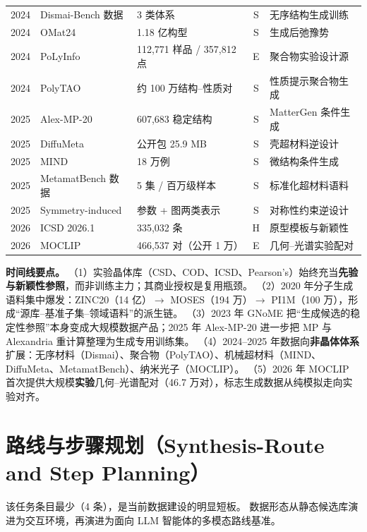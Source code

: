 \documentclass[11pt,a4paper]{ctexart}
\begin{document}
\begin{longtable}{@{}p{1.1cm}p{3.6cm}p{4.3cm}cp{5.4cm}@{}}
2024 & Dismai-Bench 数据 & 3 类体系 & S & 无序结构生成训练 \\
2024 & OMat24 & 1.18 亿构型 & S & 生成后弛豫势 \\
2024 & PoLyInfo & 112,771 样品 / 357,812 点 & E & 聚合物实验设计源 \\
2024 & PolyTAO & 约 100 万结构--性质对 & S & 性质提示聚合物生成 \\
2025 & Alex-MP-20 & 607,683 稳定结构 & S & MatterGen 条件生成 \\
2025 & DiffuMeta & 公开包 25.9 MB & S & 壳超材料逆设计 \\
2025 & MIND & 18 万例 & S & 微结构条件生成 \\
2025 & MetamatBench 数据 & 5 集 / 百万级样本 & S & 标准化超材料语料 \\
2025 & Symmetry-induced & 参数 + 图两类表示 & S & 对称性约束逆设计 \\
2026 & ICSD 2026.1 & 335,032 条 & H & 原型模板与新颖性 \\
2026 & MOCLIP & 466,537 对（公开 1 万） & E & 几何--光谱实验配对 \\
\end{longtable}

\textbf{时间线要点。}
（1）实验晶体库（CSD、COD、ICSD、Pearson's）始终充当\textbf{先验与新颖性参照}，而非训练主力；其商业授权是复用瓶颈。
（2）2020 年分子生成语料集中爆发：ZINC20（14 亿）$\to$ MOSES（194 万）$\to$ PI1M（100 万），形成``源库--基准子集--领域语料''的派生链。
（3）2023 年 GNoME 把``生成候选的稳定性参照''本身变成大规模数据产品；2025 年 Alex-MP-20 进一步把 MP 与 Alexandria 重计算整理为生成专用训练集。
（4）2024--2025 年数据向\textbf{非晶体体系}扩展：无序材料（Dismai）、聚合物（PolyTAO）、机械超材料（MIND、DiffuMeta、MetamatBench）、纳米光子（MOCLIP）。
（5）2026 年 MOCLIP 首次提供大规模\textbf{实验}几何--光谱配对（46.7 万对），标志生成数据从纯模拟走向实验对齐。

\section{路线与步骤规划（Synthesis-Route and Step Planning）}

该任务条目最少（4 条），是当前数据建设的明显短板。
数据形态从静态候选库演进为交互环境，再演进为面向 LLM 智能体的多模态路线基准。
\end{document}
